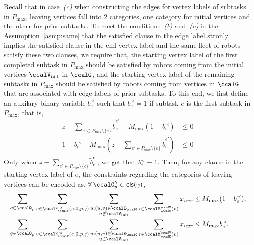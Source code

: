 \documentclass[Afour,sageh,times]{sagej}
\newcommand{\clause}[1]{\mathsf{cls}(#1)}
\begin{document}
{{{Recall that in case~\hyperref[edge:vertex3]{\it (c)}  when constructing the edges for vertex labels of subtasks in $P_{\text{max}}$, leaving vertices fall into 2 categories, one category for initial vertices and the other for prior subtasks. To meet the conditions~\hyperref[asmp:b]{\it (b)} and~\hyperref[asmp:c]{\it (c)} in the Assumption~\ref{asmp:same} that the satisfied clause in the edge label stronly implies the satisfied clause in the end vertex label and the same fleet of robots satisfy these two clauses, we require that, the starting vertex label of the first completed  subtask in $P_{\text{max}}$ should be satisfied by robots coming from the initial vertices $\ccalV_{\text{init}}$ in $\ccalG$, and the starting vertex label of the remaining subtasks in $P_{\text{max}}$ should be satisfied by robots coming from vertices in $\ccalG$ that are associated with edge labels of prior subtasks. To this end, we first define an auxilary binary variable $b_{e}^{\prec}$ such that $b_{e}^{\prec}= 1$ if subtask $e$ is the first subtask in $P_{\text{max}}$, that is,
\begin{subequations}
  \begin{align}
    z - \sum_{e' \in P_{\text{max}}\setminus \{e\}} \tilde{b}_e^{e'}  - M_{\text{max}} (1 - b_{e}^{\prec}) & \leq 0\\
    1 - b_{e}^{\prec} -  M_{\text{max}} (z - \sum_{e' \in P_{\text{max}}\setminus \{e\}} \tilde{b}_e^{e'})     & \leq 0
  \end{align}
\end{subequations}
Only when $z = \sum_{e' \in P_{\text{max}}\setminus \{e\}} \tilde{b}_e^{e'}$, we get that $b_e^{\prec}=1$. Then, for any clause in the starting vertex label of $e$, the constraints regarding the categories of leaving vertices can be encoded as, $\forall \, \ccalC_p^\gamma \in \clause{\gamma} $,
\begin{subequations}\label{eq:routingforactivation}
  \begin{align}
   & \sum_{q\in \ccalQ_p} \sum_{v \in \ccalM^\mathsf{lits}_{\ccalV}(e,0,p,q)} \sum_{\substack{u: (u,v) \in \ccalE_\ccalG \\ u \not\in \ccalV_{\text{init}}}}   \sum_{r\in \ccalM^\ccalV_{\ccalK}(v)} x_{uvr} \leq M_{\text{max}} (1 - b_e^{\prec}),  \label{eq:routingforactivation_a}\\
   & \sum_{q\in \ccalQ_p} \sum_{v \in \ccalM^\mathsf{lits}_{\ccalV}(e,0,p,q)} \sum_{\substack{u: (u,v) \in \ccalE_\ccalG \\ u \in \ccalV_{\text{init}}}}   \sum_{r\in \ccalM^\ccalV_{\ccalK}(v)} x_{uvr} \leq M_{\text{max}}  b_e^{\prec}.  \label{eq:routingforactivation_b}

\end{align}
\end{subequations}}}}
\end{document}
